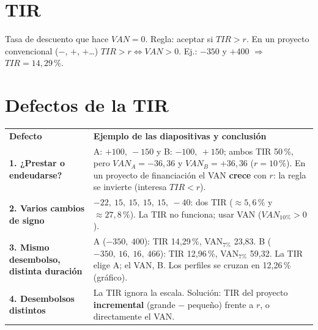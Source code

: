 \documentclass[10pt,a4paper,twoside]{article}
\newcommand{\thead}[1]{\leavevmode\sffamily\bfseries\color{white}#1}
\newcommand{\headrow}{\rowcolor{steel}}
\begin{document}
\section{TIR}
Tasa de descuento que hace $VAN=0$. Regla: aceptar si $TIR>r$. En un proyecto convencional ($-$, $+$, $+$\ldots)
$TIR>r \Leftrightarrow VAN>0$. Ej.: $-350$ y $+400$ $\Rightarrow$ $TIR=14,29\,\%$.

\section{Defectos de la TIR}

\begin{center}
\end{center}

\begin{tabularx}{\textwidth}{@{}>{\leavevmode\sffamily\bfseries\color{navy}}p{3.4cm} L@{}}
\headrow \thead{Defecto} & \thead{Ejemplo de las diapositivas y conclusión}\\
1. ¿Prestar o endeudarse? & A: $+100,\ -150$ y B: $-100,\ +150$; ambos TIR 50\,\%, pero $VAN_A=-36,36$ y $VAN_B=+36,36$ ($r=10\,\%$).
  En un proyecto de financiación el VAN \textbf{crece} con $r$: la regla se invierte (interesa $TIR<r$).\\
 2. Varios cambios de signo & $-22,\ 15,\ 15,\ 15,\ 15,\ -40$: dos TIR ($\approx5,6\,\%$ y $\approx27,8\,\%$). La TIR no funciona; usar VAN ($VAN_{10\%}>0$).\\
3. Mismo desembolso, distinta duración & A ($-350,\ 400$): TIR 14,29\,\%, VAN$_{7\%}$ 23,83. B ($-350,\ 16,\ 16,\ 466$): TIR 12,96\,\%, VAN$_{7\%}$ 59,32.
  La TIR elige A; el VAN, B. Los perfiles se cruzan en 12,26\,\% (gráfico).\\
 4. Desembolsos distintos & La TIR ignora la escala. Solución: TIR del proyecto \textbf{incremental} (grande $-$ pequeño) frente a $r$, o directamente el VAN.\\
\end{tabularx}
\end{document}
